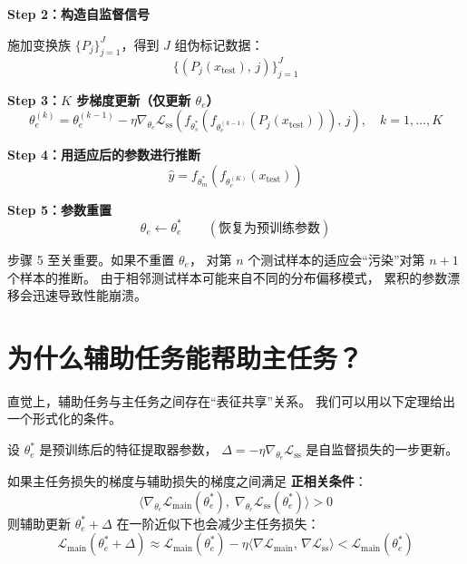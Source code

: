 \textbf{Step 2：构造自监督信号}

施加变换族 $\{P_j\}_{j=1}^{J}$，得到 $J$ 组伪标记数据：
\begin{equation}
  \{(P_j(x_\text{test}),\, j)\}_{j=1}^{J}
\end{equation}

\textbf{Step 3：$K$ 步梯度更新（仅更新 $\theta_e$）}
\begin{equation}
  \theta_e^{(k)} = \theta_e^{(k-1)}
  - \eta \nabla_{\theta_e} \mathcal{L}_\text{ss}\!\left(
    f_{\theta_s^*}\!(f_{\theta_e^{(k-1)}}(P_j(x_\text{test}))),\, j
  \right), \quad k = 1, \ldots, K
  \label{eq:ttt_update}
\end{equation}

\textbf{Step 4：用适应后的参数进行推断}
\begin{equation}
  \hat{y} = f_{\theta_m^*}\!(f_{\theta_e^{(K)}}(x_\text{test}))
  \label{eq:ttt_inference}
\end{equation}

\textbf{Step 5：参数重置}
\begin{equation}
  \theta_e \leftarrow \theta_e^* \qquad (\text{恢复为预训练参数})
  \label{eq:ttt_reset}
\end{equation}

\begin{remark}[参数重置的必要性]
步骤 5 至关重要。如果不重置 $\theta_e$，
对第 $n$ 个测试样本的适应会``污染''对第 $n+1$ 个样本的推断。
由于相邻测试样本可能来自不同的分布偏移模式，
累积的参数漂移会迅速导致性能崩溃。
\end{remark}

\section{为什么辅助任务能帮助主任务？}
\label{sec:ttt_theory}

直觉上，辅助任务与主任务之间存在``表征共享''关系。
我们可以用以下定理给出一个形式化的条件。

\begin{theorem}[辅助损失的间接改善条件]
\label{thm:ttt_indirect}
设 $\theta_e^*$ 是预训练后的特征提取器参数，
$\Delta = -\eta \nabla_{\theta_e} \mathcal{L}_\text{ss}$
是自监督损失的一步更新。

如果主任务损失的梯度与辅助损失的梯度之间满足
\textbf{正相关条件}：
\begin{equation}
  \langle
    \nabla_{\theta_e} \mathcal{L}_\text{main}(\theta_e^*),\;
    \nabla_{\theta_e} \mathcal{L}_\text{ss}(\theta_e^*)
  \rangle > 0
  \label{eq:gradient_alignment}
\end{equation}
则辅助更新 $\theta_e^* + \Delta$ 在一阶近似下也会减少主任务损失：
\begin{equation}
  \mathcal{L}_\text{main}(\theta_e^* + \Delta)
  \approx \mathcal{L}_\text{main}(\theta_e^*)
  - \eta \langle
    \nabla \mathcal{L}_\text{main},\, \nabla \mathcal{L}_\text{ss}
  \rangle < \mathcal{L}_\text{main}(\theta_e^*)
\end{equation}
\end{theorem}

